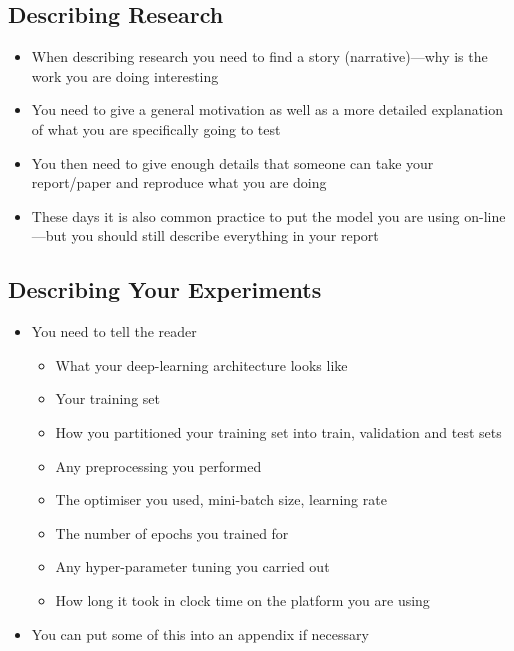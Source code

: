 
\begin{slide}
\section{Describing Research}

\begin{PauseHighLight}
  \begin{itemize}
  \item When describing research you need to find a story
    (narrative)\pause---why is the work you are doing
    interesting\pauseb
  \item You need to give a general motivation as well as a more
    detailed explanation of what you are specifically going to
    test\pause
  \item You then need to give enough details that someone can take
    your report/paper and reproduce what you are doing\pause
  \item These days it is also common practice to put the model you
    are using on-line\pause---but you should still describe everything
    in your report\pauseb
  \end{itemize}
\end{PauseHighLight}

\end{slide}


\begin{slide}
\section[-1]{Describing Your Experiments}

\begin{PauseHighLight}
  \begin{itemize}
  \item You need to tell the reader
    \begin{itemize}\squeeze
    \item What  your deep-learning architecture looks like\pause
    \item Your training set\pause
    \item How you partitioned your training set into train, validation
      and test sets\pause
    \item  Any preprocessing you performed\pause
    \item The optimiser you used, mini-batch size, learning rate\pause
    \item The number of epochs you trained for\pause
    \item Any hyper-parameter tuning you carried out\pause
    \item How long it took in clock time on the platform you are using\pause
    \end{itemize}
  \item You can put some of this into an appendix if necessary\pause
  \end{itemize}
\end{PauseHighLight}

\end{slide}

